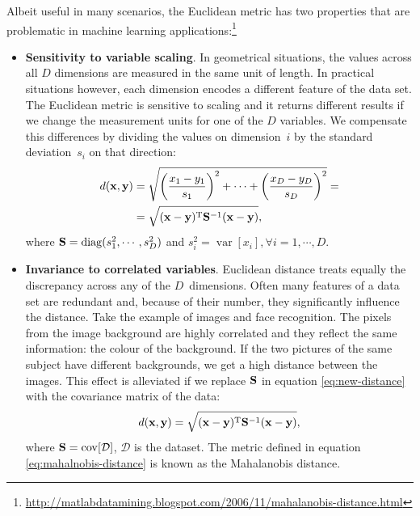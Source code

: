 Albeit useful in many scenarios, the Euclidean metric has two properties that are problematic in machine learning applications:\footnote{\protect\url{http://matlabdatamining.blogspot.com/2006/11/mahalanobis-distance.html}}
	\begin{itemize}
		 \item{ \textbf{Sensitivity to variable scaling}. In geometrical situations, the values across all $D$ dimensions are measured in the same unit of length. In practical situations however, each dimension encodes a different feature of the data set. The Euclidean metric is sensitive to scaling and it returns different results if we change the measurement units for one of the $D$ variables. We compensate this differences by dividing the values on dimension~$i$ by the standard deviation~$s_i$ on that direction:
		  \begin{align}
		   d(\mathbf{x},\mathbf{y}) &= \sqrt{\left(\frac{x_1-y_1}{s_1}\right)^2+\cdots+\left(\frac{x_D-y_D}{s_D}\right)^2} = \notag\\
		   &= \sqrt{(\mathbf{x-y})^\textrm{T}\mathbf{S}^{-1}(\mathbf{x-y})}, \label{eq:new-distance}
		  \end{align}
		 where $\mathbf{S}=\operatorname{diag}(s_1^2,\cdots,s_D^2)$ and $s_i^2 = \operatorname{var}[x_i],\forall i=1,\cdots,D$.
		 }
		 \item{ \textbf{Invariance to correlated variables}. Euclidean distance treats equally the discrepancy across any of the $D$~dimensions. Often many features of a data set are redundant and, because of their number, they significantly influence the distance. Take the example of images and face recognition. The pixels from the image background are highly correlated and they reflect the same information: the colour of the background. If the two pictures of the same subject have different backgrounds, we get a high distance between the images. This effect is alleviated if we replace $\mathbf{S}$ in equation \eqref{eq:new-distance} with the covariance matrix of the data:
		 \begin{align}
		 d(\mathbf{x},\mathbf{y}) = \sqrt{(\mathbf{x-y})^\textrm{T}\mathbf{S}^{-1}(\mathbf{x-y})},
		 \label{eq:mahalnobis-distance}
		 \end{align}
		 where $\mathbf{S} = \operatorname{cov}[\mathcal{D}]$, $\mathcal{D}$ is the dataset. The metric defined in equation \eqref{eq:mahalnobis-distance} is known as the Mahalanobis distance. %
		 }
	\end{itemize}
